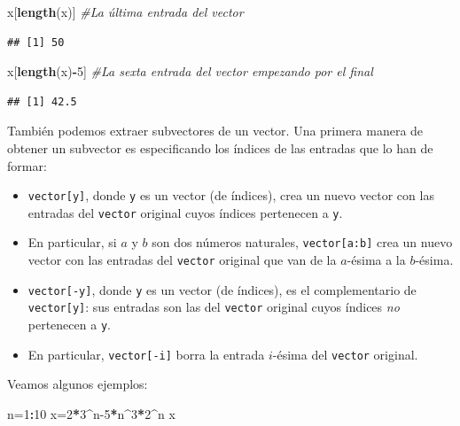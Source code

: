 \documentclass[]{book}
\newenvironment{Shaded}{\begin{snugshade}}{\end{snugshade}}
\newcommand{\CommentTok}[1]{\textcolor[rgb]{0.56,0.35,0.01}{\textit{#1}}}
\newcommand{\DecValTok}[1]{\textcolor[rgb]{0.00,0.00,0.81}{#1}}
\newcommand{\KeywordTok}[1]{\textcolor[rgb]{0.13,0.29,0.53}{\textbf{#1}}}
\newcommand{\NormalTok}[1]{#1}
\newcommand{\OperatorTok}[1]{\textcolor[rgb]{0.81,0.36,0.00}{\textbf{#1}}}
\providecommand{\tightlist}{%
  \setlength{\itemsep}{0pt}\setlength{\parskip}{0pt}}
\theoremstyle{definition}
\theoremstyle{definition}
\theoremstyle{definition}
\theoremstyle{remark}
\begin{document}
\begin{Shaded}
\begin{Highlighting}[]
\NormalTok{x[}\KeywordTok{length}\NormalTok{(x)]  }\CommentTok{#La última entrada del vector}
\end{Highlighting}
\end{Shaded}

\begin{verbatim}
## [1] 50
\end{verbatim}

\begin{Shaded}
\begin{Highlighting}[]
\NormalTok{x[}\KeywordTok{length}\NormalTok{(x)}\OperatorTok{-}\DecValTok{5}\NormalTok{] }\CommentTok{#La sexta entrada del vector empezando por el final}
\end{Highlighting}
\end{Shaded}

\begin{verbatim}
## [1] 42.5
\end{verbatim}

También podemos extraer subvectores de un vector. Una primera manera de obtener un subvector es especificando los índices de las entradas que lo han de formar:

\begin{itemize}
\tightlist
\item
  \texttt{vector{[}y{]}}, donde \texttt{y} es un vector (de índices), crea un nuevo vector con las entradas del \texttt{vector} original cuyos índices pertenecen a \texttt{y}.
\item
  En particular, si \(a\) y \(b\) son dos números naturales, \texttt{vector{[}a:b{]}} crea un nuevo vector con las entradas del \texttt{vector} original que van de la \(a\)-ésima a la \(b\)-ésima.
\item
  \texttt{vector{[}-y{]}}, donde \texttt{y} es un vector (de índices), es el complementario de \texttt{vector{[}y{]}}: sus entradas son las del \texttt{vector} original cuyos índices \emph{no} pertenecen a \texttt{y}.
\item
  En particular, \texttt{vector{[}-i{]}} borra la entrada \(i\)-ésima del \texttt{vector} original.
\end{itemize}

Veamos algunos ejemplos:

\begin{Shaded}
\begin{Highlighting}[]
\NormalTok{n=}\DecValTok{1}\OperatorTok{:}\DecValTok{10}
\NormalTok{x=}\DecValTok{2}\OperatorTok{*}\DecValTok{3}\OperatorTok{^}\NormalTok{n}\DecValTok{-5}\OperatorTok{*}\NormalTok{n}\OperatorTok{^}\DecValTok{3}\OperatorTok{*}\DecValTok{2}\OperatorTok{^}\NormalTok{n}
\NormalTok{x}
\end{Highlighting}
\end{Shaded}
\end{document}
